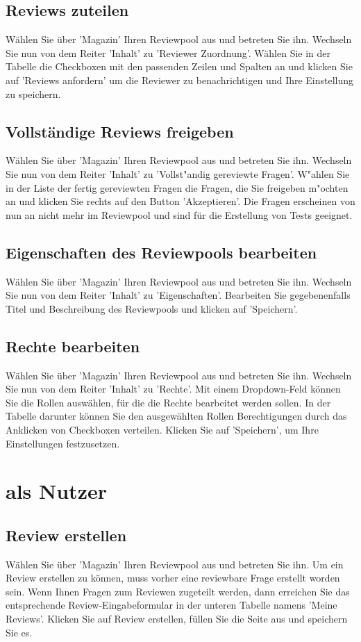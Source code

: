 \documentclass[12pt,a4paper]{scrreprt}
\begin{document}
\subsection{Reviews zuteilen}
Wählen Sie über 'Magazin' Ihren Reviewpool aus und betreten Sie ihn. Wechseln Sie nun von dem Reiter 'Inhalt' zu 'Reviewer Zuordnung'. Wählen Sie in der Tabelle die Checkboxen mit den passenden Zeilen und Spalten an und klicken Sie auf 'Reviews anfordern' um die Reviewer zu benachrichtigen und Ihre Einstellung zu speichern.
		
\subsection{Vollständige Reviews freigeben}
Wählen Sie über 'Magazin' Ihren Reviewpool aus und betreten Sie ihn. Wechseln Sie nun von dem Reiter 'Inhalt' zu 'Vollst"andig gereviewte Fragen'. W"ahlen Sie in der Liste der fertig gereviewten Fragen die Fragen, die Sie freigeben m"ochten an und klicken Sie rechts auf den Button 'Akzeptieren'. Die Fragen erscheinen von nun an nicht mehr im Reviewpool und sind für die Erstellung von Tests geeignet.
		
\subsection{Eigenschaften des Reviewpools bearbeiten}
Wählen Sie über 'Magazin' Ihren Reviewpool aus und betreten Sie ihn. Wechseln Sie nun von dem Reiter 'Inhalt' zu 'Eigenschaften'. Bearbeiten Sie gegebenenfalls Titel und Beschreibung des Reviewpools und klicken auf 'Speichern'. 
		
\subsection{Rechte bearbeiten}
Wählen Sie über 'Magazin' Ihren Reviewpool aus und betreten Sie ihn. Wechseln Sie nun von dem Reiter 'Inhalt' zu 'Rechte'. Mit einem Dropdown-Feld können Sie die Rollen auswählen, für die die Rechte bearbeitet werden sollen. In der Tabelle darunter können Sie den ausgewählten Rollen Berechtigungen durch das Anklicken von Checkboxen verteilen. Klicken Sie auf 'Speichern', um Ihre Einstellungen festzusetzen. 
		
\section{als Nutzer}
	
\subsection{Review erstellen}
Wählen Sie über 'Magazin' Ihren Reviewpool aus und betreten Sie ihn. Um ein Review erstellen zu können, muss vorher eine reviewbare Frage erstellt worden sein. Wenn Ihnen Fragen zum Reviewen zugeteilt werden, dann erreichen Sie das entsprechende Review-Eingabeformular in der unteren Tabelle namens 'Meine Reviews'. Klicken Sie auf Review erstellen, füllen Sie die Seite aus und speichern Sie es. \\		
		
\end{document}
